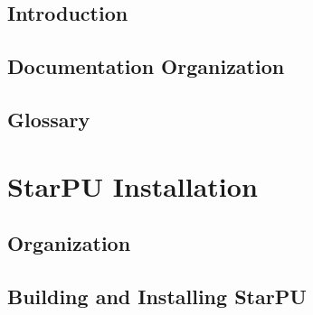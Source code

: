 %
%
%
%
%
\newcommand\starputitle{StarPU Handbook}
\setcounter{tocdepth}{1}


\chapter{Introduction}
\label{index}
\hypertarget{index}{}


\chapter{Documentation Organization}
\label{DocumentationOrganization}
\hypertarget{DocumentationOrganization}{}


\chapter{Glossary}
\label{Glossary}
\hypertarget{Glossary}{}


\part{StarPU Installation}

\chapter{Organization}
\label{IntroInstallation}
\hypertarget{IntroInstallation}{}


\chapter{Building and Installing StarPU}
\label{BuildingAndInstallingStarPU}
\hypertarget{BuildingAndInstallingStarPU}{}


